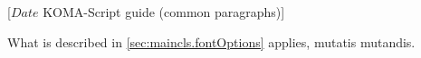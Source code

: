 %
%
%
%
%
%
%
%
% 
%
%
%
%

                 [$Date$
                  KOMA-Script guide (common paragraphs)]


\makeatletter
{}%
%
%
%
\makeatother


\label{sec:\csname label@base\endcsname.fontOptions}
\ifshortversion\IgnoreThisfalse{}\fi%
\ifIgnoreThis %
What is described in \autoref{sec:maincls.fontOptions} applies, mutatis mutandis.
\else %

